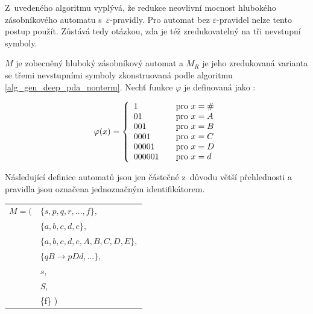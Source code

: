 Z~uvedeného algoritmu vyplývá, že redukce neovlivní mocnost hlubokého zásobníkového automatu s~$\varepsilon$-pravidly. Pro automat bez $\varepsilon$-pravidel nelze tento postup použít. Zůstává tedy otázkou, zda je též zredukovatelný na tři nevstupní symboly.


\newpage

\begin{Example}\label{example_symbol}
$M$ je zobecněný hluboký zásobníkový automat a $M_{R}$ je jeho zredukovaná varianta se třemi nevstupními symboly zkonstruovaná podle algoritmu \ref{alg_gen_deep_pda_nonterm}. Nechť funkce $\varphi$ je definovaná jako :

\[ \varphi(x) = \left\{
  \begin{array}{l l}
    1 & \quad \text{pro $x = \#$}\\
    01 & \quad \text{pro $x = A$}\\
    001 & \quad \text{pro $x = B$}\\
    0001 & \quad \text{pro $x = C$}\\
    00001 & \quad \text{pro $x = D$}\\
    000001 & \quad \text{pro $x = d$}
  \end{array} \right.\]

\medskip

Následující definice automatů jsou jen částečné z~důvodu větší přehlednosti a pravidla jsou označena jednoznačným identifikátorem.
\bigskip

\setlength{\deftabcolsep}{\tabcolsep}
\setlength{\tabcolsep}{1pt}

\begin{tabular}{ll}

$M = ($&$\{s,p,q,r,\dots,f\},$ \\
     &$\{a,b,c,d,e\}, $\\
     &$\{a,b,c,d,e,A,B,C,D,E\},$ \\
     &$\{qB \rightarrow p Dd, \dots\},$\\
     &$s,$ \\
     &$S,$ \\
     &\{f\} )
\end{tabular}

\bigskip

\begin{tabular}{llp{12cm}l}


\end{tabular}
\end{Example}
